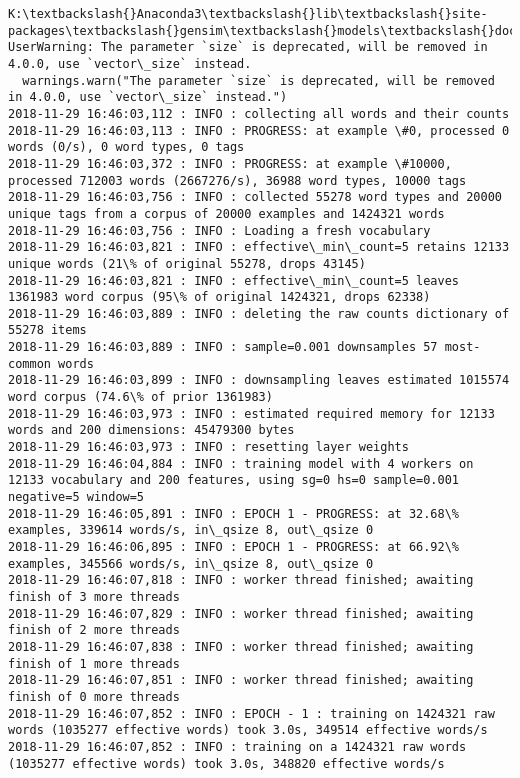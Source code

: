 \documentclass[11pt]{article}
\begin{document}
    \begin{Verbatim}[commandchars=\\\{\}]
K:\textbackslash{}Anaconda3\textbackslash{}lib\textbackslash{}site-packages\textbackslash{}gensim\textbackslash{}models\textbackslash{}doc2vec.py:570: UserWarning: The parameter `size` is deprecated, will be removed in 4.0.0, use `vector\_size` instead.
  warnings.warn("The parameter `size` is deprecated, will be removed in 4.0.0, use `vector\_size` instead.")
2018-11-29 16:46:03,112 : INFO : collecting all words and their counts
2018-11-29 16:46:03,113 : INFO : PROGRESS: at example \#0, processed 0 words (0/s), 0 word types, 0 tags
2018-11-29 16:46:03,372 : INFO : PROGRESS: at example \#10000, processed 712003 words (2667276/s), 36988 word types, 10000 tags
2018-11-29 16:46:03,756 : INFO : collected 55278 word types and 20000 unique tags from a corpus of 20000 examples and 1424321 words
2018-11-29 16:46:03,756 : INFO : Loading a fresh vocabulary
2018-11-29 16:46:03,821 : INFO : effective\_min\_count=5 retains 12133 unique words (21\% of original 55278, drops 43145)
2018-11-29 16:46:03,821 : INFO : effective\_min\_count=5 leaves 1361983 word corpus (95\% of original 1424321, drops 62338)
2018-11-29 16:46:03,889 : INFO : deleting the raw counts dictionary of 55278 items
2018-11-29 16:46:03,889 : INFO : sample=0.001 downsamples 57 most-common words
2018-11-29 16:46:03,899 : INFO : downsampling leaves estimated 1015574 word corpus (74.6\% of prior 1361983)
2018-11-29 16:46:03,973 : INFO : estimated required memory for 12133 words and 200 dimensions: 45479300 bytes
2018-11-29 16:46:03,973 : INFO : resetting layer weights
2018-11-29 16:46:04,884 : INFO : training model with 4 workers on 12133 vocabulary and 200 features, using sg=0 hs=0 sample=0.001 negative=5 window=5
2018-11-29 16:46:05,891 : INFO : EPOCH 1 - PROGRESS: at 32.68\% examples, 339614 words/s, in\_qsize 8, out\_qsize 0
2018-11-29 16:46:06,895 : INFO : EPOCH 1 - PROGRESS: at 66.92\% examples, 345566 words/s, in\_qsize 8, out\_qsize 0
2018-11-29 16:46:07,818 : INFO : worker thread finished; awaiting finish of 3 more threads
2018-11-29 16:46:07,829 : INFO : worker thread finished; awaiting finish of 2 more threads
2018-11-29 16:46:07,838 : INFO : worker thread finished; awaiting finish of 1 more threads
2018-11-29 16:46:07,851 : INFO : worker thread finished; awaiting finish of 0 more threads
2018-11-29 16:46:07,852 : INFO : EPOCH - 1 : training on 1424321 raw words (1035277 effective words) took 3.0s, 349514 effective words/s
2018-11-29 16:46:07,852 : INFO : training on a 1424321 raw words (1035277 effective words) took 3.0s, 348820 effective words/s

\end{Verbatim}
\end{document}
